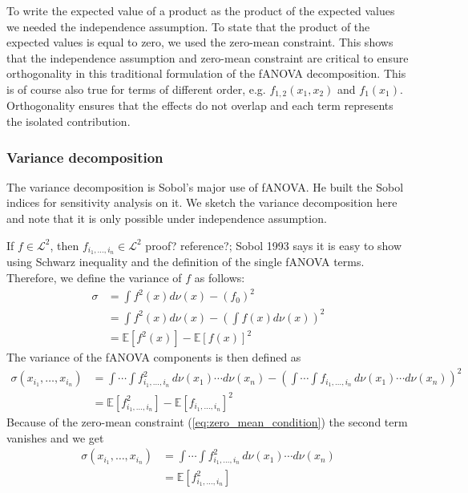 To write the expected value of a product as the product of the expected values we needed the independence assumption. To state that the product of the expected values is equal to zero, we used the zero-mean constraint. This shows that the independence assumption and zero-mean constraint are critical to ensure orthogonality in this traditional formulation of the fANOVA decomposition. This is of course also true for terms of different order, e.g. \( f_{1,2}(x_1, x_2) \) and \( f_{1}(x_1) \). Orthogonality ensures that the effects do not overlap and each term represents the isolated contribution.

\subsubsection*{Variance decomposition}
The variance decomposition is Sobol's major use of fANOVA. He built the Sobol indices for sensitivity analysis on it. We sketch the variance decomposition here and note that it is only possible under independence assumption.\par
If $f \in \mathcal{L}^2$, then $f_{i_{1}, \dots, i_{n}} \in \mathcal{L}^2$ {\color{blue}proof? reference?; Sobol 1993 says it is easy to show using Schwarz inequality and the definition of the single fANOVA terms.}
Therefore, we define the variance of $f$ as follows:
\begin{align*}
    \sigma &= \int f^2(x)d\nu (x) - (f_0)^2 \\
    &= \int f^2(x)d\nu (x) - (\int f(x)d\nu (x))^2 \\
    &= \mathbb{E}[f^2(x)] - \mathbb{E}[f(x)]^2
    \label{variance_whole}
\end{align*}
The variance of the fANOVA components is then defined as
\begin{align*}
    \sigma(x_{i_1}, \dots, x_{i_n})
    &= \int \cdots \int f^2_{i_{1}, \dots, i_{n}} \, d\nu(x_1) \cdots d\nu(x_n) - \left( \int \cdots \int f_{i_{1}, \dots, i_{n}} \, d\nu(x_1) \cdots d\nu(x_n) \right)^2\\
    &= \mathbb{E}[f^2_{i_{1}, \dots, i_{n}}] - \mathbb{E}[f_{i_{1}, \dots, i_{n}}]^2
\end{align*}
Because of the zero-mean constraint (\autoref{eq:zero_mean_condition}) the second term vanishes and we get
\begin{align*}
    \sigma(x_{i_1}, \dots, x_{i_n})
    &= \int \cdots \int f^2_{i_{1}, \dots, i_{n}} \, d\nu(x_1) \cdots d\nu(x_n)\\
    &= \mathbb{E}[f^2_{i_{1}, \dots, i_{n}}]
\end{align*}

